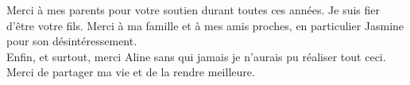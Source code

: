 Merci à mes parents pour votre soutien durant toutes ces années. Je suis fier 
d'être votre fils. Merci à ma famille et à mes amis proches, en particulier 
Jasmine pour son désintéressement.\\

Enfin, et surtout, merci Aline sans qui jamais je n'aurais pu réaliser tout ceci.\\
Merci de partager ma vie et de la rendre meilleure.






